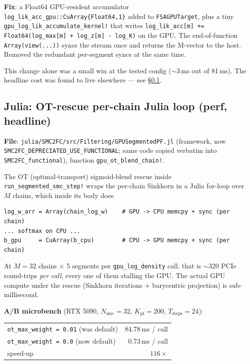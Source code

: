 \documentclass[11pt,a4paper]{article}
\begin{document}
\textbf{Fix}: a Float64 GPU-resident accumulator
\texttt{log\_lik\_acc\_gpu::CuArray\{Float64,1\}} added to
\texttt{FSAGPUTarget}, plus a tiny
\texttt{gpu\_log\_lik\_accumulate\_kernel!} that writes
\texttt{log\_lik\_acc[m] += Float64(log\_max[m] + log\_z[m] - log\_K)}
on the GPU. The end-of-function \texttt{Array(view(...))} syncs the
stream once and returns the M-vector to the host. Removed the
redundant per-segment syncs at the same time.

This change alone was a small win at the tested config ($\sim 3$\,ms
out of 81\,ms). The headline cost was found to live elsewhere ---
see \S\ref{sec:bug_ot}.

\subsection{Julia: OT-rescue per-chain Julia loop (perf, headline)}\label{sec:bug_ot}

\textbf{File}: \texttt{julia/SMC2FC/src/Filtering/GPUSegmentedPF.jl}
(framework, now \texttt{SMC2FC\_DEPRECIATED\_USE\_FUNCTIONAL}; same
code copied verbatim into \texttt{SMC2FC\_functional}), function
\texttt{gpu\_ot\_blend\_chain!}.

The OT (optimal-transport) sigmoid-blend rescue inside
\texttt{run\_segmented\_smc\_step!} wraps the per-chain Sinkhorn
in a Julia for-loop over $M$ chains, which inside its body does

\begin{lstlisting}
log_w_arr = Array(chain_log_w)    # GPU -> CPU memcpy + sync (per chain)
... softmax on CPU ...
b_gpu     = CuArray(b_cpu)        # CPU -> GPU memcpy + sync (per chain)
\end{lstlisting}

At $M=32$ chains $\times$ 5 segments per \texttt{gpu\_log\_density}
call, that is $\sim$320 PCIe round-trips \emph{per call}, every one
of them stalling the GPU. The actual GPU compute under the rescue
(Sinkhorn iterations + barycentric projection) is sub-millisecond.

\textbf{A/B microbench} (RTX 5090, $N_{\text{smc}}=32$,
$K_{\text{pf}}=200$, $T_{\text{steps}}=24$):

\begin{center}
\begin{tabular}{lr}
  \toprule
  \texttt{ot\_max\_weight = 0.01} (was default) & 84.78\,ms / call \\
  \texttt{ot\_max\_weight = 0.0}  (now default) &  0.73\,ms / call \\
  \midrule
  speed-up                                       & $116\times$ \\
  \bottomrule
\end{tabular}
\end{center}
\end{document}
